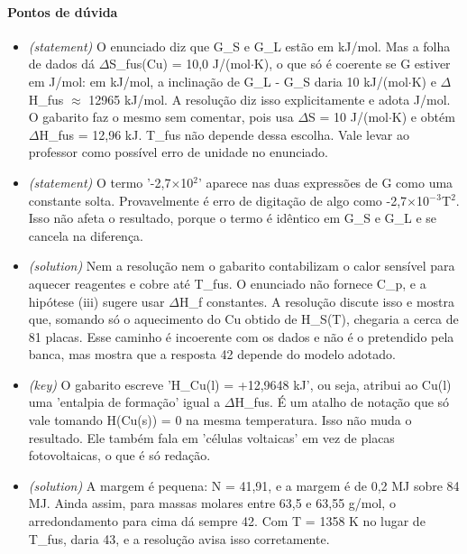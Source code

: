 \documentclass{article}%
\begin{document}
\paragraph{Pontos de dúvida}%
\begin{itemize}%
\item%
\textit{(statement)} O enunciado diz que G\_S e G\_L estão em kJ/mol. Mas a folha de dados dá $\Delta$S\_fus(Cu) = 10,0 J/(mol$\cdot$K), o que só é coerente se G estiver em J/mol: em kJ/mol, a inclinação de G\_L - G\_S daria 10 kJ/(mol$\cdot$K) e $\Delta$H\_fus $\approx$ 12965 kJ/mol. A resolução diz isso explicitamente e adota J/mol. O gabarito faz o mesmo sem comentar, pois usa $\Delta$S = 10 J/(mol$\cdot$K) e obtém $\Delta$H\_fus = 12,96 kJ. T\_fus não depende dessa escolha. Vale levar ao professor como possível erro de unidade no enunciado.%
\item%
\textit{(statement)} O termo '-2,7$\times$10$^2$' aparece nas duas expressões de G como uma constante solta. Provavelmente é erro de digitação de algo como -2,7$\times$10$^{-}$$^3$T$^2$. Isso não afeta o resultado, porque o termo é idêntico em G\_S e G\_L e se cancela na diferença.%
\item%
\textit{(solution)} Nem a resolução nem o gabarito contabilizam o calor sensível para aquecer reagentes e cobre até T\_fus. O enunciado não fornece C\_p, e a hipótese (iii) sugere usar $\Delta$H\_f constantes. A resolução discute isso e mostra que, somando só o aquecimento do Cu obtido de H\_S(T), chegaria a cerca de 81 placas. Esse caminho é incoerente com os dados e não é o pretendido pela banca, mas mostra que a resposta 42 depende do modelo adotado.%
\item%
\textit{(key)} O gabarito escreve 'H\_Cu(l) = +12,9648 kJ', ou seja, atribui ao Cu(l) uma 'entalpia de formação' igual a $\Delta$H\_fus. É um atalho de notação que só vale tomando H(Cu(s)) = 0 na mesma temperatura. Isso não muda o resultado. Ele também fala em 'células voltaicas' em vez de placas fotovoltaicas, o que é só redação.%
\item%
\textit{(solution)} A margem é pequena: N = 41,91, e a margem é de 0,2 MJ sobre 84 MJ. Ainda assim, para massas molares entre 63,5 e 63,55 g/mol, o arredondamento para cima dá sempre 42. Com T = 1358 K no lugar de T\_fus, daria 43, e a resolução avisa isso corretamente.%
\end{itemize}%
\end{document}
